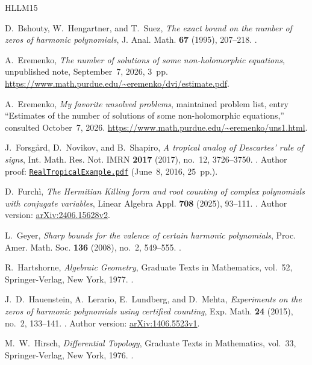 \documentclass[UTF8,11pt]{ctexart}
\theoremstyle{definition}
\numberwithin{equation}{section}
\begin{document}
\clearpage
\begin{thebibliography}{HLLM15}
\raggedright

D.~Bshouty, W.~Hengartner, and T.~Suez,
\emph{The exact bound on the number of zeros of harmonic polynomials},
J. Anal. Math. \textbf{67} (1995), 207--218.
.

A.~Eremenko,
\emph{The number of solutions of some non-holomorphic equations},
unpublished note, September~7, 2026, 3~pp.
\url{https://www.math.purdue.edu/~eremenko/dvi/estimate.pdf}.

A.~Eremenko, \emph{My favorite unsolved problems}, maintained problem list,
entry ``Estimates of the number of solutions of some non-holomorphic
equations,'' consulted October~7, 2026.
\url{https://www.math.purdue.edu/~eremenko/uns1.html}.

J.~Forsg{\aa}rd, D.~Novikov, and B.~Shapiro,
\emph{A tropical analog of Descartes' rule of signs},
Int. Math. Res. Not. IMRN \textbf{2017} (2017), no.~12, 3726--3750.
.
Author proof: \href{https://staff.math.su.se/shapiro/Articles/RealTropicalExample.pdf}
{\texttt{RealTropicalExample.pdf}} (June~8, 2016, 25~pp.).

D.~Furch\`i,
\emph{The Hermitian Killing form and root counting of complex polynomials
with conjugate variables},
Linear Algebra Appl. \textbf{708} (2025), 93--111.
.
Author version: \href{https://arxiv.org/abs/2406.15628v2}{arXiv:2406.15628v2}.

L.~Geyer,
\emph{Sharp bounds for the valence of certain harmonic polynomials},
Proc. Amer. Math. Soc. \textbf{136} (2008), no.~2, 549--555.
.

R.~Hartshorne,
\emph{Algebraic Geometry},
Graduate Texts in Mathematics, vol.~52, Springer-Verlag, New York, 1977.
.

J.~D.~Hauenstein, A.~Lerario, E.~Lundberg, and D.~Mehta,
\emph{Experiments on the zeros of harmonic polynomials using certified counting},
Exp. Math. \textbf{24} (2015), no.~2, 133--141.
.
Author version: \href{https://arxiv.org/abs/1406.5523v1}{arXiv:1406.5523v1}.

M.~W.~Hirsch,
\emph{Differential Topology},
Graduate Texts in Mathematics, vol.~33, Springer-Verlag, New York, 1976.
.


\end{thebibliography}
\end{document}
